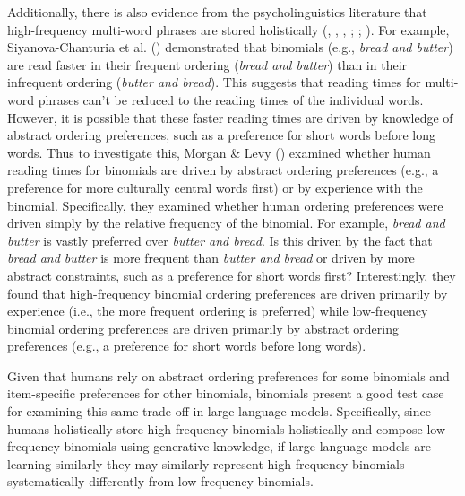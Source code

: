 \documentclass[
  12pt,
  letterpaper,
]{scrreport}
\begin{document}
Additionally, there is also evidence from the psycholinguistics
literature that high-frequency multi-word phrases are stored
holistically (,
,
,
;
;
). For example, Siyanova-Chanturia et al.
()
demonstrated that binomials (e.g., \emph{bread and butter}) are read
faster in their frequent ordering (\emph{bread and butter}) than in
their infrequent ordering (\emph{butter and bread}). This suggests that
reading times for multi-word phrases can't be reduced to the reading
times of the individual words. However, it is possible that these faster
reading times are driven by knowledge of abstract ordering preferences,
such as a preference for short words before long words. Thus to
investigate this, Morgan \& Levy
() examined
whether human reading times for binomials are driven by abstract
ordering preferences (e.g., a preference for more culturally central
words first) or by experience with the binomial. Specifically, they
examined whether human ordering preferences were driven simply by the
relative frequency of the binomial. For example, \emph{bread and butter}
is vastly preferred over \emph{butter and bread}. Is this driven by the
fact that \emph{bread and butter} is more frequent than \emph{butter and
bread} or driven by more abstract constraints, such as a preference for
short words first? Interestingly, they found that high-frequency
binomial ordering preferences are driven primarily by experience (i.e.,
the more frequent ordering is preferred) while low-frequency binomial
ordering preferences are driven primarily by abstract ordering
preferences (e.g., a preference for short words before long words).

Given that humans rely on abstract ordering preferences for some
binomials and item-specific preferences for other binomials, binomials
present a good test case for examining this same trade off in large
language models. Specifically, since humans holistically store
high-frequency binomials holistically and compose low-frequency
binomials using generative knowledge, if large language models are
learning similarly they may similarly represent high-frequency binomials
systematically differently from low-frequency binomials.
\end{document}
